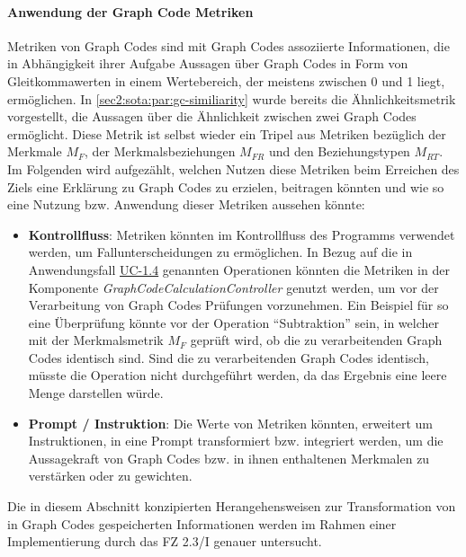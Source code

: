 \paragraph{Anwendung der Graph Code Metriken}
Metriken von Graph Codes sind mit Graph Codes assoziierte Informationen, die in Abhängigkeit ihrer Aufgabe Aussagen über Graph Codes in Form von Gleitkommawerten in einem Wertebereich, der meistens zwischen 0 und 1 liegt, ermöglichen. In \cref{sec2:sota:par:gc-similiarity} wurde bereits die Ähnlichkeitsmetrik vorgestellt, die Aussagen über die Ähnlichkeit zwischen zwei Graph Codes ermöglicht.
Diese Metrik ist selbst wieder ein Tripel aus Metriken bezüglich der Merkmale $M_F$, der Merkmalsbeziehungen $M_{FR}$ und den Beziehungstypen $M_{RT}$.
Im Folgenden wird aufgezählt, welchen Nutzen diese Metriken beim Erreichen des Ziels eine Erklärung zu Graph Codes zu erzielen, beitragen könnten und wie so eine Nutzung bzw. Anwendung dieser Metriken aussehen könnte:
\begin{itemize}
    \item \textbf{Kontrollfluss}: Metriken könnten im Kontrollfluss des Programms verwendet werden, um Fallunterscheidungen zu ermöglichen.
    In Bezug auf die in Anwendungsfall \hyperref[sec3:model:uc-1.4]{UC-1.4} genannten Operationen könnten die Metriken in der Komponente \textit{GraphCodeCalculationController} genutzt werden, um vor der Verarbeitung von Graph Codes Prüfungen vorzunehmen.
    Ein Beispiel für so eine Überprüfung könnte vor der Operation \enquote{Subtraktion} sein, in welcher mit der Merkmalsmetrik $M_F$ geprüft wird, ob die zu verarbeitenden Graph Codes identisch sind.
    Sind die zu verarbeitenden Graph Codes identisch, müsste die Operation nicht durchgeführt werden, da das Ergebnis eine leere Menge darstellen würde.
    \item \textbf{Prompt / Instruktion}: Die Werte von Metriken könnten, erweitert um Instruktionen, in eine Prompt transformiert bzw. integriert werden, um die Aussagekraft von Graph Codes bzw. in ihnen enthaltenen Merkmalen zu verstärken oder zu gewichten.
\end{itemize}



Die in diesem Abschnitt konzipierten Herangehensweisen zur Transformation von in Graph Codes gespeicherten Informationen werden im Rahmen einer Implementierung durch das FZ 2.3/I genauer untersucht.

